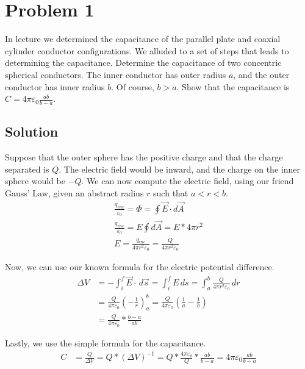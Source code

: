 \documentclass[12pt]{article}
\begin{document}
\section*{Problem 1}
In lecture we determined the capacitance of the parallel plate and coaxial cylinder conductor configurations. 
We alluded to a set of steps that leads to determining the capacitance. 
Determine the capacitance of two concentric spherical conductors. 
The inner conductor has outer radius $a$, and the outer conductor has inner radius $b$. 
Of course, $b > a$. 
Show that the capacitance is $C = 4\pi\varepsilon_0\frac{ab}{b - a}$.

\subsection*{Solution}
Suppose that the outer sphere has the positive charge and that the charge separated is $Q$. 
The electric field would be inward, and the charge on the inner sphere would be $-Q$.
We can now compute the electric field, using our friend Gauss' Law, given an abstract radius $r$ such that $a < r < b$.
\begin{gather*}
    \frac{q_{enc}}{\varepsilon_0} = \Phi = \oint \vec{E} \cdot d\vec{A}\\
    \frac{q_{enc}}{\varepsilon_0} = E \oint d\vec{A} = E * 4\pi r^2\\
    E   =   \frac{q_{enc}}{4\pi r^2 \varepsilon_0}
        =   \frac{Q}{4\pi r^2 \varepsilon_0}
\end{gather*}

Now, we can use our known formula for the electric potential difference.
\begin{align*}
    \Delta V    &=  -\int_{i}^{f} \vec{E} \cdot \,d\vec{s}
        =   \int_{i}^{f} E\,ds
        =   \int_{a}^{b} \frac{Q}{4\pi r^2 \varepsilon_0}\,dr\\
        &=  \frac{Q}{4\pi \varepsilon_0} \left( -\frac{1}{r} \right)_a^b
        =   \frac{Q}{4\pi \varepsilon_0} \left( \frac{1}{a} - \frac{1}{b} \right)\\
        &=  \frac{Q}{4\pi \varepsilon_0} * \frac{b - a}{ab}
\end{align*}

Lastly, we use the simple formula for the capacitance.
\begin{align*}
    C   &=  \frac{Q}{\Delta V}
        =   Q * (\Delta V)^{-1}
        =   Q * \frac{4\pi \varepsilon_0}{Q} * \frac{ab}{b - a}
        =   \boxed{4\pi \varepsilon_0 \frac{ab}{b - a}}
\end{align*}
\end{document}
